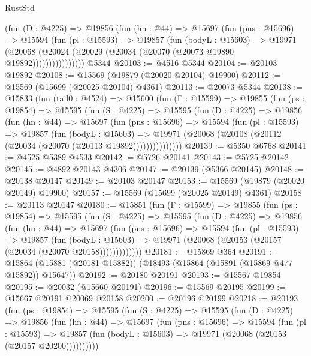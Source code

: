 \begin{lexlean}{RustStd}
\begin{coremodule}
              (fun (D : @4225) =>
              @19856
                (fun (hn : @44) =>
                @15697
                  (fun (pns : @15696) =>
                  @15594
                    (fun (pl : @15593) =>
                    @19857
                      (fun (bodyL : @15603) =>
                      @19971
                        (@20068
                          (@20024 (@20029 (@20034 (@20070 (@20073 @19890 @19892))))))))))))))))
    @5344
@20103 := @4516 @5344
@20104 := @20103 @19892
@20108 := @15569 (@19879 (@20020 @20104) @19900)
@20112 := @15569 (@15699 (@20025 @20104) @4361)
@20113 := @20073 @5344
@20138 := @15833
    (fun (tail0 : @4524) =>
    @15600
      (fun (Γ : @15599) =>
      @19855
        (fun (ps : @19854) =>
        @15595
          (fun (S : @4225) =>
          @15595
            (fun (D : @4225) =>
            @19856
              (fun (hn : @44) =>
              @15697
                (fun (pns : @15696) =>
                @15594
                  (fun (pl : @15593) =>
                  @19857
                    (fun (bodyL : @15603) =>
                    @19971 (@20068 (@20108 (@20112 (@20034 (@20070 (@20113 @19892)))))))))))))))
@20139 := @5350 @6768
@20141 := @4525 @5389 @4533
@20142 := @5726 @20141
@20143 := @5725 @20142
@20145 := @4892 @20143 @4306
@20147 := @20139 (@5366 @20145)
@20148 := @20138 @20147
@20149 := @20103 @20147
@20153 := @15569 (@19879 (@20020 @20149) @19900)
@20157 := @15569 (@15699 (@20025 @20149) @4361)
@20158 := @20113 @20147
@20180 := @15851
    (fun (Γ : @15599) =>
    @19855
      (fun (ps : @19854) =>
      @15595
        (fun (S : @4225) =>
        @15595
          (fun (D : @4225) =>
          @19856
            (fun (hn : @44) =>
            @15697
              (fun (pns : @15696) =>
              @15594
                (fun (pl : @15593) =>
                @19857
                  (fun (bodyL : @15603) =>
                  @19971 (@20068 (@20153 (@20157 (@20034 (@20070 @20158)))))))))))))
@20181 := @15869 @364
@20191 := @15864 (@15881 (@20181 @15882)) (@18493 (@15864 (@15891 (@15869 @477 @15892)) @15647))
@20192 := @20180 @20191
@20193 := @15567 @19854
@20195 := @20032 (@15660 @20191)
@20196 := @15569 @20195
@20199 := @15667 @20191 @20069 @20158
@20200 := @20196 @20199
@20218 := @20193
    (fun (ps : @19854) =>
    @15595
      (fun (S : @4225) =>
      @15595
        (fun (D : @4225) =>
        @19856
          (fun (hn : @44) =>
          @15697
            (fun (pns : @15696) =>
            @15594
              (fun (pl : @15593) =>
              @19857 (fun (bodyL : @15603) => @19971 (@20068 (@20153 (@20157 @20200))))))))))

\end{coremodule}
\end{lexlean}
